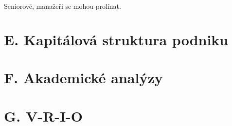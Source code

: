 
Seniorové, manažeři se mohou prolínat.

\section*{E. Kapitálová struktura podniku}
\label{sec:Kapitalova struktura podniku}

\section*{F. Akademické analýzy}
\label{sec:Akademicke analyzy}

\section*{G. V-R-I-O}
\label{sec:V-R-I-O}
